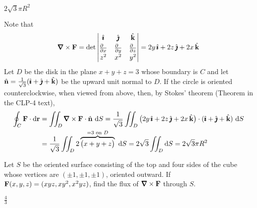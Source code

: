 \begin{answer} 
$2\sqrt{3}\pi R^2$
\end{answer}


\begin{solution}
Note that
$$
\vnabla\times\vF=\det\left|\begin{matrix}\hi&\hj&\hk\\[0.03in] \frac{\partial\hfill}{\partial x}&
        \frac{\partial\hfill}{\partial y}&
        \frac{\partial\hfill}{\partial z}\\[0.03in]
z^2&x^2&y^2\end{matrix}\right|
=2y\,\hi+2z\,\hj+2x\,\hk
$$
Let $D$ be the disk in the plane $x+y+z=3$ whose boundary is $C$ and let
$\hat{\mathbf{n}}=\frac{1}{\sqrt{3}}(\hat{\pmb{\imath}}+\hat{\pmb{\jmath}}+\hat{\mathbf{k}})$ be the upward unit normal to $D$.
If the circle is oriented counterclockwise, when viewed from above,
then, by Stokes' theorem  (Theorem  in the CLP-4 text),
\begin{align*}
\oint_C \vF\cdot \dee{\vr}
&=\dblInt_D \vnabla\times\vF\cdot\hn\ \dee{S}
=\frac{1}{\sqrt{3}}
\dblInt_D \big(2y\,\hi+2z\,\hj+2x\,\hk\big)\cdot(\hi+\hj+\hk)\ \dee{S}\\
&=\frac{1}{\sqrt{3}}\dblInt_D2\overbrace{\big(x+y+z\big)}^{=3\text{ on $D$}}\ \dee{S}
=2\sqrt{3}\dblInt_D \dee{S}
=2\sqrt{3}\pi R^2
\end{align*}
\end{solution}

\begin{question}
Let $S$ be the oriented surface consisting of the top and
four sides of the cube whose vertices are $(\pm 1,\pm1,\pm1)$, oriented
outward. If $\mathbf{F}(x,y,z)=(xyz,xy^2,x^2yz)$, find the flux of 
$\vnabla\times\vF$ through $S$.
\end{question}


\begin{answer} 
$\frac{4}{3}$
\end{answer}


